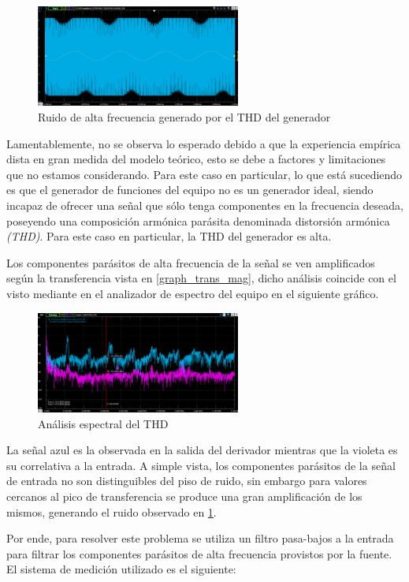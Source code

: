 \begin{figure}[H]
    \centering
    \includegraphics[width=0.6\textwidth]{../Ejercicio3-CircuitoIntegradoresyDerivadores/Imagenes/Derivador/ruido_alto_f.png}
    \caption{Ruido de alta frecuencia generado por el THD del generador}
    \label{thd}
\end{figure}
Lamentablemente, no se observa lo esperado debido a que la experiencia empírica dista en gran medida del modelo 
teórico, esto se debe a factores y limitaciones que no estamos considerando. Para este caso en particular, 
lo que está sucediendo es que el generador de funciones del equipo no es un generador ideal,
 siendo incapaz de ofrecer 
una señal que sólo tenga componentes en la frecuencia deseada, poseyendo una composición armónica
 parásita denominada distorsión armónica
\textit{(THD)}. Para este caso en particular, la THD del generador es alta. \par 
 Los componentes parásitos de alta frecuencia de la señal se ven amplificados según 
la transferencia vista en \ref{graph_trans_mag}, dicho análisis coincide con el visto mediante en el analizador 
de espectro del equipo en el siguiente gráfico. 
\begin{figure}[H]
    \centering
    \includegraphics[width=0.6\textwidth]{../Ejercicio3-CircuitoIntegradoresyDerivadores/Imagenes/Derivador/thd.png}
    \caption{Análisis espectral del THD}

\end{figure}
La señal azul es la observada en la salida del derivador mientras que la violeta es su correlativa a la entrada.
A simple vista, los componentes parásitos de la señal de entrada no son distinguibles del piso de ruido, sin embargo
para valores cercanos al pico de transferencia se produce una gran amplificación de los mismos, generando el ruido
observado en  \ref{thd}. \par 
Por ende, para resolver este problema se utiliza un filtro pasa-bajos a la entrada para filtrar los componentes 
parásitos de alta frecuencia provistos por la fuente.  El sistema de medición utilizado es el siguiente:

